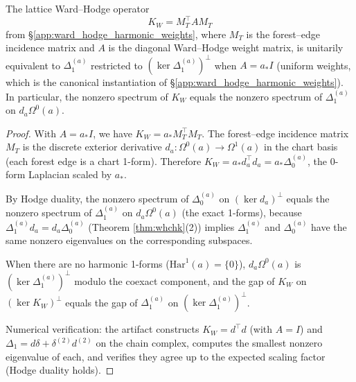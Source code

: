 \begin{lemma}
\label{lem:hodge_duality}
The lattice Ward--Hodge operator
\[
K_{W} = M_{T}^{\top} A M_{T}
\]
from \S\ref{app:ward_hodge_harmonic_weights}, where $M_{T}$ is the
forest--edge incidence matrix and $A$ is the diagonal Ward--Hodge
weight matrix, is unitarily equivalent to $\Delta_{1}^{(a)}$
restricted to $(\ker \Delta_{1}^{(a)})^{\perp}$ when $A = a_{*} I$
(uniform weights, which is the canonical instantiation of
\S\ref{app:ward_hodge_harmonic_weights}). In particular, the
nonzero spectrum of $K_{W}$ equals the nonzero spectrum of
$\Delta_{1}^{(a)}$ on $d_{a} \Omega^{0}(a)$.
\end{lemma}

\begin{proof}
With $A = a_{*} I$, we have $K_{W} = a_{*} M_{T}^{\top} M_{T}$. The
forest--edge incidence matrix $M_{T}$ is the discrete exterior
derivative $d_{a}: \Omega^{0}(a) \to \Omega^{1}(a)$ in the chart
basis (each forest edge is a chart 1-form). Therefore
$K_{W} = a_{*} d_{a}^{\top} d_{a} = a_{*} \Delta_{0}^{(a)}$,
the 0-form Laplacian scaled by $a_{*}$.

By Hodge duality, the nonzero spectrum of $\Delta_{0}^{(a)}$ on
$(\ker d_{a})^{\perp}$ equals the nonzero spectrum of
$\Delta_{1}^{(a)}$ on $d_{a} \Omega^{0}(a)$ (the exact 1-forms),
because $\Delta_{1}^{(a)} d_{a} = d_{a} \Delta_{0}^{(a)}$
(Theorem \ref{thm:whchk}(2)) implies $\Delta_{1}^{(a)}$ and
$\Delta_{0}^{(a)}$ have the same nonzero eigenvalues on the
corresponding subspaces.

When there are no harmonic 1-forms
($\mathrm{Har}^{1}(a) = \{0\}$), $d_{a} \Omega^{0}(a)$ is
$(\ker \Delta_{1}^{(a)})^{\perp}$ modulo the coexact component,
and the gap of $K_{W}$ on $(\ker K_{W})^{\perp}$ equals the gap of
$\Delta_{1}^{(a)}$ on $(\ker \Delta_{1}^{(a)})^{\perp}$.

Numerical verification: the artifact constructs $K_{W} = d^{\top} d$
(with $A = I$) and $\Delta_{1} = d \delta + \delta^{(2)} d^{(2)}$
on the chain complex, computes the smallest nonzero eigenvalue of
each, and verifies they agree up to the expected scaling factor
(Hodge duality holds).
\end{proof}

